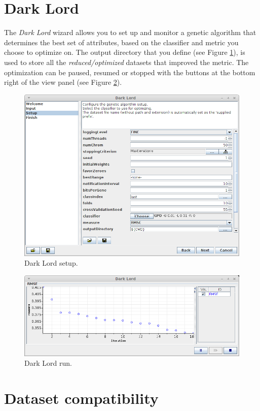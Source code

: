 \section{Dark Lord}
The \textit{Dark Lord} wizard allows you to set up and monitor a genetic
algorithm that determines the best set of attributes, based on the classifier
and metric you choose to optimize on. The output directory that you define
(see Figure \ref{darklord_setup}), is used to store all the \textit{reduced/optimized}
datasets that improved the metric. The optimization can be paused, resumed or
stopped with the buttons at the bottom right of the view panel (see Figure
\ref{darklord_run}).

\begin{figure}[htb]
  \centering
  \includegraphics[width=12.0cm]{images/darklord_setup.png}
  \caption{Dark Lord setup.}
  \label{darklord_setup}
\end{figure}

\begin{figure}[htb]
  \centering
  \includegraphics[width=12.0cm]{images/darklord_run.png}
  \caption{Dark Lord run.}
  \label{darklord_run}
\end{figure}

\clearpage
\section{Dataset compatibility}

